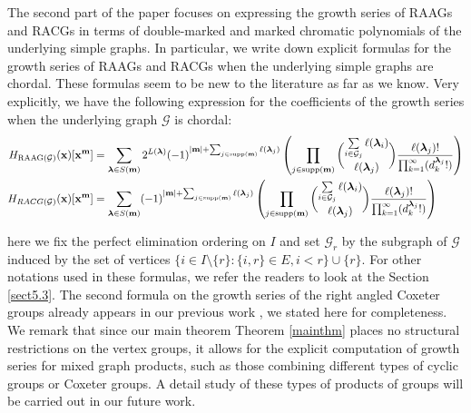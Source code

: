 \documentclass[11pt,reqno]{amsart}
\numberwithin{equation}{section} %
\theoremstyle{definition}
\theoremstyle{remark}
\newcommand{\RAAG}{\operatorname{RAAG}}
\numberwithin{equation}{section}
\begin{document}
The second part of the paper focuses on expressing the growth series of RAAGs and RACGs in terms of double-marked and marked chromatic polynomials of the underlying simple graphs. In particular, we write down explicit formulas for the growth series of RAAGs and RACGs when the underlying simple graphs are chordal. These formulas seem to be new to the literature as far as we know. Very explicitly, we have the following expression for the coefficients of the growth series when the underlying graph $\mathcal{G}$ is chordal:
\begin{align*}
H_{\RAAG(\mathcal G)}(\mathbf x)[\bold x^{\bold m}] &= \sum\limits_{\boldsymbol{\lambda}\in S(\bold m)}2^{L(\boldsymbol{\lambda})}(-1)^{|\mathbf{m}|+\sum_{j\in \mathrm{supp}(\bold{m})}\ell(\boldsymbol{\lambda}_{j})}\left(\prod _{j\in \mathrm{supp}(\bold{m})} \binom{\sum\limits_{i\in \mathcal{G}_j}\ell(\boldsymbol{\lambda}_{i})}{\ell(\boldsymbol{\lambda}_{j})} \frac{\ell(\boldsymbol{\lambda}_{j})!}{\prod_{k=1}^{\infty}(d^{\boldsymbol{\lambda}_{j}}_{k}!)}\right)\\
H_{RACG(\mathcal{G})}(\bold x) [\bold x^{\bold m}] &=  \sum\limits_{\boldsymbol{\lambda}\in S(\bold m)}(-1)^{|\mathbf{m}|+\sum_{j\in \mathrm{supp}(\bold{m})}\ell(\boldsymbol{\lambda}_{j})}\left(\prod _{j\in \mathrm{supp}(\bold{m})} \binom{\sum\limits_{i\in \mathcal{G}_j}\ell(\boldsymbol{\lambda}_{i})}{\ell(\boldsymbol{\lambda}_{j})} \frac{\ell(\boldsymbol{\lambda}_{j})!}{\prod_{k=1}^{\infty}(d^{\boldsymbol{\lambda}_{j}}_{k}!)}\right)
\end{align*}

here we fix the perfect elimination ordering on $I$ and  set $\mathcal{G}_r$ by the subgraph of $\mathcal{G}$ induced by the set of vertices 
 $\{i\in I\setminus \{r\}: \{i,r\}\in E, i<r\}\cup \{r\}$. For other notations used in these formulas, we
 refer the readers to look at the Section \ref{sect5.3}. The second formula on the growth series of the right angled Coxeter groups already appears in our previous work \cite{CDV}, we stated here for completeness. 
We remark that since our main theorem Theorem \ref{mainthm} places no structural restrictions on the vertex groups, it allows for the explicit computation of growth series for mixed graph products, such as those combining different types of cyclic groups or Coxeter groups. A detail study of these types of products of groups will be carried out in our future work. 
\end{document}
